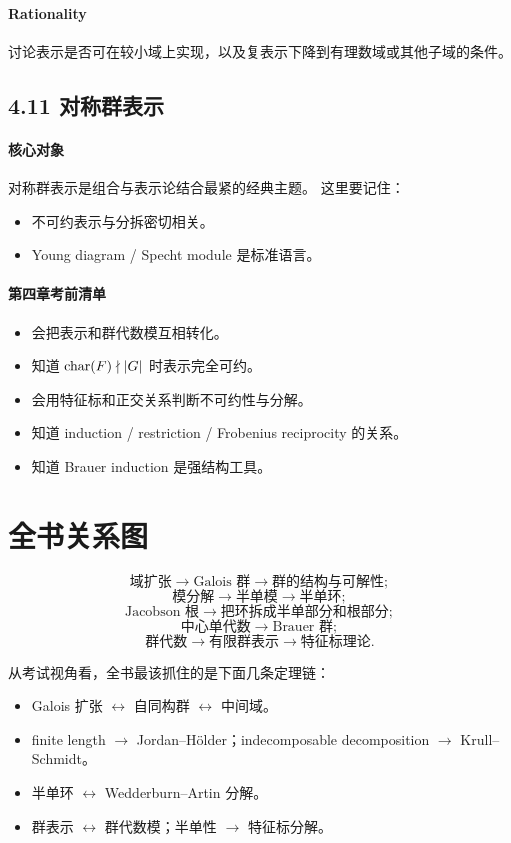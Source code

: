 \documentclass[a4paper]{ctexart}
\begin{document}
\paragraph{Rationality}
讨论表示是否可在较小域上实现，以及复表示下降到有理数域或其他子域的条件。

\subsection{4.11 对称群表示}

\paragraph{核心对象}
对称群表示是组合与表示论结合最紧的经典主题。
这里要记住：
\begin{itemize}
  \item 不可约表示与分拆密切相关。
  \item Young diagram / Specht module 是标准语言。
\end{itemize}

\paragraph{第四章考前清单}
\begin{itemize}
  \item 会把表示和群代数模互相转化。
  \item 知道 \({\rm char}(F)\nmid |G|\) 时表示完全可约。
  \item 会用特征标和正交关系判断不可约性与分解。
  \item 知道 induction / restriction / Frobenius reciprocity 的关系。
  \item 知道 Brauer induction 是强结构工具。
\end{itemize}

\section*{全书关系图}
{}

\[
\text{域扩张}
\to
\text{Galois 群}
\to
\text{群的结构与可解性};
\]
\[
\text{模分解}
\to
\text{半单模}
\to
\text{半单环};
\]
\[
\text{Jacobson 根}
\to
\text{把环拆成半单部分和根部分};
\]
\[
\text{中心单代数}
\to
\text{Brauer 群};
\]
\[
\text{群代数}
\to
\text{有限群表示}
\to
\text{特征标理论}.
\]

从考试视角看，全书最该抓住的是下面几条定理链：
\begin{itemize}
  \item Galois 扩张 \(\leftrightarrow\) 自同构群 \(\leftrightarrow\) 中间域。
  \item finite length \(\to\) Jordan--H\"older；indecomposable decomposition \(\to\) Krull--Schmidt。
  \item 半单环 \(\leftrightarrow\) Wedderburn--Artin 分解。
  \item 群表示 \(\leftrightarrow\) 群代数模；半单性 \(\to\) 特征标分解。
\end{itemize}
\end{document}
